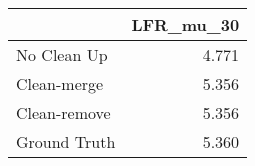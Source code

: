 \begin{tabular}{lr}
\toprule
{} & LFR_mu_30 \\
\midrule
No Clean Up  &     4.771 \\
Clean-merge  &     5.356 \\
Clean-remove &     5.356 \\
Ground Truth &     5.360 \\
\bottomrule
\end{tabular}
